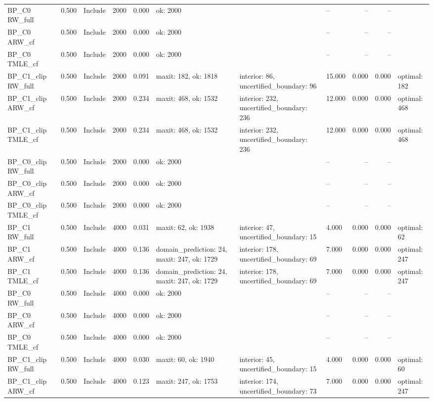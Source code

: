 \begin{tabular}{llllrlllrrl}
BP\_C0 RW\_full & 0.500 & Include & 2000 & 0.000 & ok: 2000 &  & -- & -- & -- &  \\
BP\_C0 ARW\_cf & 0.500 & Include & 2000 & 0.000 & ok: 2000 &  & -- & -- & -- &  \\
BP\_C0 TMLE\_cf & 0.500 & Include & 2000 & 0.000 & ok: 2000 &  & -- & -- & -- &  \\
BP\_C1\_clip RW\_full & 0.500 & Include & 2000 & 0.091 & maxit: 182, ok: 1818 & interior: 86, uncertified\_boundary: 96 & 15.000 & 0.000 & 0.000 & optimal: 182 \\
BP\_C1\_clip ARW\_cf & 0.500 & Include & 2000 & 0.234 & maxit: 468, ok: 1532 & interior: 232, uncertified\_boundary: 236 & 12.000 & 0.000 & 0.000 & optimal: 468 \\
BP\_C1\_clip TMLE\_cf & 0.500 & Include & 2000 & 0.234 & maxit: 468, ok: 1532 & interior: 232, uncertified\_boundary: 236 & 12.000 & 0.000 & 0.000 & optimal: 468 \\
BP\_C0\_clip RW\_full & 0.500 & Include & 2000 & 0.000 & ok: 2000 &  & -- & -- & -- &  \\
BP\_C0\_clip ARW\_cf & 0.500 & Include & 2000 & 0.000 & ok: 2000 &  & -- & -- & -- &  \\
BP\_C0\_clip TMLE\_cf & 0.500 & Include & 2000 & 0.000 & ok: 2000 &  & -- & -- & -- &  \\
BP\_C1 RW\_full & 0.500 & Include & 4000 & 0.031 & maxit: 62, ok: 1938 & interior: 47, uncertified\_boundary: 15 & 4.000 & 0.000 & 0.000 & optimal: 62 \\
BP\_C1 ARW\_cf & 0.500 & Include & 4000 & 0.136 & domain\_prediction: 24, maxit: 247, ok: 1729 & interior: 178, uncertified\_boundary: 69 & 7.000 & 0.000 & 0.000 & optimal: 247 \\
BP\_C1 TMLE\_cf & 0.500 & Include & 4000 & 0.136 & domain\_prediction: 24, maxit: 247, ok: 1729 & interior: 178, uncertified\_boundary: 69 & 7.000 & 0.000 & 0.000 & optimal: 247 \\
BP\_C0 RW\_full & 0.500 & Include & 4000 & 0.000 & ok: 2000 &  & -- & -- & -- &  \\
BP\_C0 ARW\_cf & 0.500 & Include & 4000 & 0.000 & ok: 2000 &  & -- & -- & -- &  \\
BP\_C0 TMLE\_cf & 0.500 & Include & 4000 & 0.000 & ok: 2000 &  & -- & -- & -- &  \\
BP\_C1\_clip RW\_full & 0.500 & Include & 4000 & 0.030 & maxit: 60, ok: 1940 & interior: 45, uncertified\_boundary: 15 & 4.000 & 0.000 & 0.000 & optimal: 60 \\
BP\_C1\_clip ARW\_cf & 0.500 & Include & 4000 & 0.123 & maxit: 247, ok: 1753 & interior: 174, uncertified\_boundary: 73 & 7.000 & 0.000 & 0.000 & optimal: 247 \\

\end{tabular}
